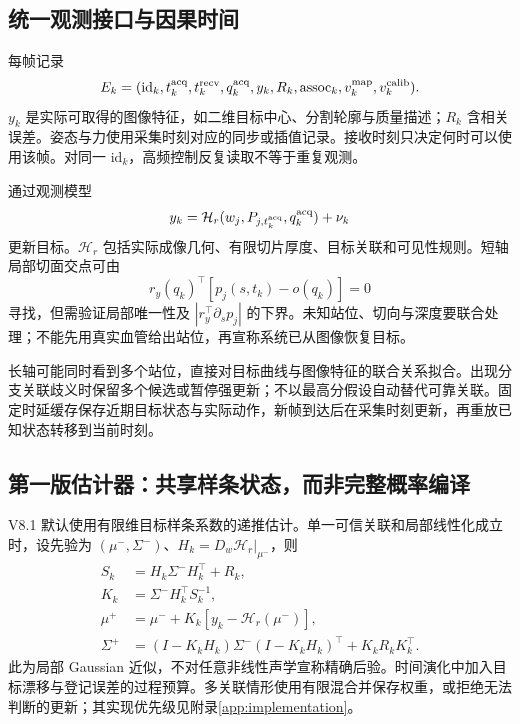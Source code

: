 \documentclass[UTF8,11pt,a4paper,fontset=fandol]{ctexart}
\numberwithin{equation}{section}
\theoremstyle{definition}
\begin{document}
\subsection{统一观测接口与因果时间}
每帧记录
\begin{equation}
E_k=(\mathrm{id}_k,t_k^{\rm acq},t_k^{\rm recv},q_k^{\rm acq},
 y_k,R_k,\mathrm{assoc}_k,v_k^{\rm map},v_k^{\rm calib}).
\label{eq:evidencerecord}
\end{equation}
$y_k$ 是实际可取得的图像特征，如二维目标中心、分割轮廓与质量描述；$R_k$ 含相关误差。姿态与力使用采集时刻对应的同步或插值记录。接收时刻只决定何时可以使用该帧。对同一 $\mathrm{id}_k$，高频控制反复读取不等于重复观测。

通过观测模型
\begin{equation}
y_k=\mathcal H_r(w_j,P_{j,t_k^{\rm acq}},q_k^{\rm acq})+\nu_k
\label{eq:observation}
\end{equation}
更新目标。$\mathcal H_r$ 包括实际成像几何、有限切片厚度、目标关联和可见性规则。短轴局部切面交点可由
\begin{equation}
r_y(q_k)^{\top}[p_j(s,t_k)-o(q_k)]=0
\label{eq:intersection}
\end{equation}
寻找，但需验证局部唯一性及 $|r_y^\top\partial_sp_j|$ 的下界。未知站位、切向与深度要联合处理；不能先用真实血管给出站位，再宣称系统已从图像恢复目标。

长轴可能同时看到多个站位，直接对目标曲线与图像特征的联合关系拟合。出现分支关联歧义时保留多个候选或暂停强更新；不以最高分假设自动替代可靠关联。固定时延缓存保存近期目标状态与实际动作，新帧到达后在采集时刻更新，再重放已知状态转移到当前时刻。

\subsection{第一版估计器：共享样条状态，而非完整概率编译}
V8.1 默认使用有限维目标样条系数的递推估计。单一可信关联和局部线性化成立时，设先验为 $(\mu^-,\Sigma^-)$、$H_k=D_w\mathcal H_r|_{\mu^-}$，则
\begin{align}
S_k&=H_k\Sigma^-H_k^\top+R_k,\\
K_k&=\Sigma^-H_k^\top S_k^{-1},\\
\mu^+&=\mu^-+K_k[y_k-\mathcal H_r(\mu^-)],\\
\Sigma^+&=(I-K_kH_k)\Sigma^-(I-K_kH_k)^\top+K_kR_kK_k^\top.
\label{eq:filter}
\end{align}
此为局部 Gaussian 近似，不对任意非线性声学宣称精确后验。时间演化中加入目标漂移与登记误差的过程预算。多关联情形使用有限混合并保存权重，或拒绝无法判断的更新；其实现优先级见附录\ref{app:implementation}。
\end{document}
